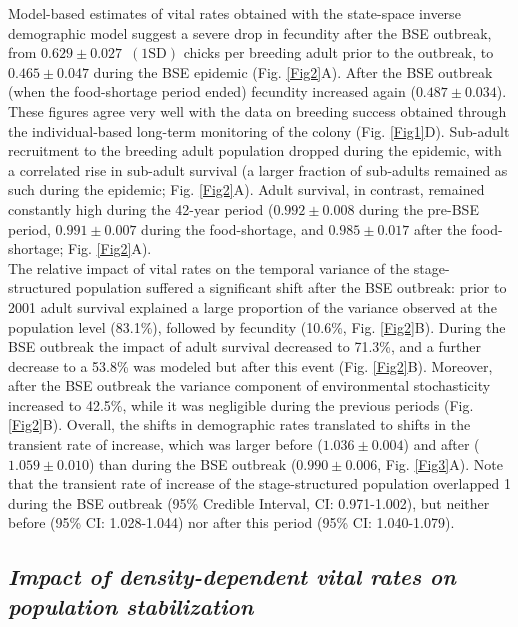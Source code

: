 \documentclass[12pt]{article}
\begin{document}
Model-based estimates of vital rates obtained with the state-space inverse demographic model suggest a severe drop in fecundity after the BSE outbreak, from $0.629 \pm 0.027 \enspace (1\text{SD})$ chicks per breeding adult prior to the outbreak, to $0.465 \pm 0.047$ during the BSE epidemic (Fig. \ref{Fig2}A). After the BSE outbreak (when the food-shortage period ended) fecundity increased again ($0.487 \pm 0.034$). These figures agree very well with the data on breeding success obtained through the individual-based long-term monitoring of the colony (Fig. \ref{Fig1}D). Sub-adult recruitment to the breeding adult population dropped during the epidemic, with a correlated rise in sub-adult survival (a larger fraction of sub-adults remained as such during the epidemic; Fig. \ref{Fig2}A). Adult survival, in contrast, remained constantly high during the 42-year period ($0.992 \pm 0.008$ during the pre-BSE period, $0.991 \pm 0.007$ during the food-shortage, and $0.985 \pm 0.017$ after the food-shortage; Fig. \ref{Fig2}A). \\

The relative impact of vital rates on the temporal variance of the stage-structured population suffered a significant shift after the BSE outbreak: prior to 2001 adult survival explained a large proportion of the variance observed at the population level (83.1\%), followed by fecundity (10.6\%, Fig. \ref{Fig2}B). During the BSE outbreak the impact of adult survival decreased to 71.3\%, and a further decrease to a 53.8\% was modeled but after this event (Fig. \ref{Fig2}B). Moreover, after the BSE outbreak the variance component of environmental stochasticity increased to 42.5\%, while it was negligible during the previous periods (Fig. \ref{Fig2}B). Overall, the shifts in demographic rates translated to shifts in the transient rate of increase, which was larger before ($1.036 \pm 0.004$) and after ($1.059 \pm 0.010$) than during the BSE outbreak ($0.990 \pm 0.006$, Fig. \ref{Fig3}A). Note that the transient rate of increase of the stage-structured population overlapped 1 during the BSE outbreak (95\% Credible Interval, CI: 0.971-1.002), but neither before (95\% CI: 1.028-1.044) nor after this period (95\% CI: 1.040-1.079). \\

\subsection*{\textit{Impact of density-dependent vital rates on population stabilization}}
\end{document}
